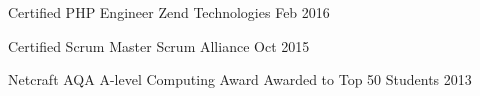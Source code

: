 




\begin{cvhonors}


\cvhonor
{Certified PHP Engineer} %
{Zend Technologies} %
{} %
{Feb 2016} %


\cvhonor
{Certified Scrum Master} %
{Scrum Alliance} %
{} %
{Oct 2015} %




\cvhonor
{Netcraft AQA A-level Computing Award} %
{Awarded to Top 50 Students} %
{} %
{2013} %


\end{cvhonors}





\begin{cvhonors}





\end{cvhonors}